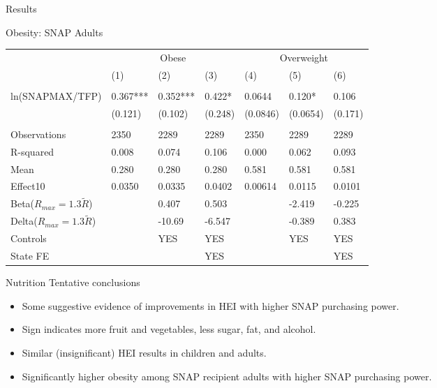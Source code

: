 \documentclass{beamer}
\begin{document}
\begin{frame}{Results}
\begin{table}{Obesity: SNAP Adults}
\begin{adjustbox}{max width=\textwidth}
\begin{tabular}{lllllll}
\toprule
 & \multicolumn{3}{c}{Obese} & \multicolumn{3}{c}{Overweight} \\
 & (1) & (2) & (3) & (4) & (5) & (6) \\
\midrule
 \\
ln(SNAPMAX/TFP) & 0.367*** & 0.352*** & 0.422* & 0.0644 & 0.120* & 0.106 \\
 & (0.121) & (0.102) & (0.248) & (0.0846) & (0.0654) & (0.171) \\
 \\
Observations & 2350 & 2289 & 2289 & 2350 & 2289 & 2289 \\
R-squared & 0.008 & 0.074 & 0.106 & 0.000 & 0.062 & 0.093 \\
Mean & 0.280 & 0.280 & 0.280 & 0.581 & 0.581 & 0.581 \\
Effect10 & 0.0350 & 0.0335 & 0.0402 & 0.00614 & 0.0115 & 0.0101 \\
Beta($R_{max}=1.3\tilde{R}$) &  & 0.407 & 0.503 &  & -2.419 & -0.225 \\
Delta($R_{max}=1.3\tilde{R}$) &  & -10.69 & -6.547 &  & -0.389 & 0.383 \\
Controls &&YES &YES &&YES & YES\\
State FE &  &  & YES &  &  & YES \\
\bottomrule
\end{tabular}

\end{adjustbox}
\end{table}
\end{frame}
\begin{frame}{Nutrition}
Tentative conclusions
 
\begin{itemize}
\item Some suggestive evidence of improvements in HEI with higher SNAP purchasing power.
\item Sign indicates more fruit and vegetables, less sugar, fat, and alcohol.
\item Similar (insignificant) HEI  results in children and adults.
\item Significantly higher obesity among SNAP recipient adults with higher SNAP purchasing power.
\end{itemize}
\end{frame}
\begin{frame}[plain]
\hspace{34mm}
\end{frame}
\end{document}
